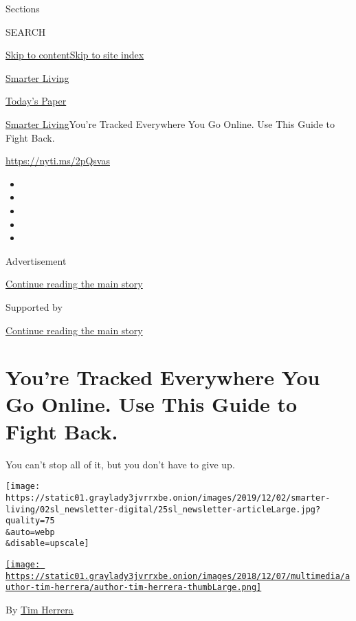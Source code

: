Sections

SEARCH

\protect\hyperlink{site-content}{Skip to
content}\protect\hyperlink{site-index}{Skip to site index}

\href{https://www.nytimes3xbfgragh.onion/section/smarter-living}{Smarter
Living}

\href{https://myaccount.nytimes3xbfgragh.onion/auth/login?response_type=cookie\&client_id=vi}{}

\href{https://www.nytimes3xbfgragh.onion/section/todayspaper}{Today's
Paper}

\href{/section/smarter-living}{Smarter Living}\textbar{}You're Tracked
Everywhere You Go Online. Use This Guide to Fight Back.

\href{https://nyti.ms/2pQsvas}{https://nyti.ms/2pQsvas}

\begin{itemize}
\item
\item
\item
\item
\item
\end{itemize}

Advertisement

\protect\hyperlink{after-top}{Continue reading the main story}

Supported by

\protect\hyperlink{after-sponsor}{Continue reading the main story}

\hypertarget{youre-tracked-everywhere-you-go-online-use-this-guide-to-fight-back}{%
\section{You're Tracked Everywhere You Go Online. Use This Guide to
Fight
Back.}\label{youre-tracked-everywhere-you-go-online-use-this-guide-to-fight-back}}

You can't stop all of it, but you don't have to give up.

\texttt{[image: https://static01.graylady3jvrrxbe.onion/images/2019/12/02/smarter-living/02sl\_newsletter-digital/25sl\_newsletter-articleLarge.jpg?quality=75\\\&auto=webp\\\&disable=upscale]}

\href{https://www.nytimes3xbfgragh.onion/by/tim-herrera}{\texttt{[image: https://static01.graylady3jvrrxbe.onion/images/2018/12/07/multimedia/author-tim-herrera/author-tim-herrera-thumbLarge.png]}}

By \href{https://www.nytimes3xbfgragh.onion/by/tim-herrera}{Tim Herrera}

